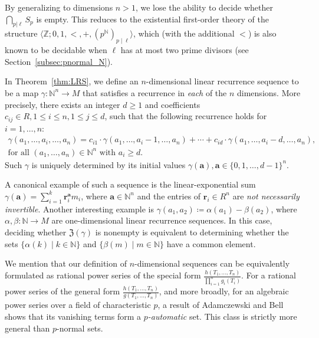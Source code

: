 \documentclass[letterpaper, 11pt, thm-restate]{article}
\numberwithin{equation}{section}
\newcommand{\Z}{\mathbb{Z}}
\newcommand{\N}{\mathbb{N}}
\newcommand{\mZ}{\mathfrak{Z}}
\newcommand{\ba}{\boldsymbol{a}}
\newcommand{\br}{\boldsymbol{r}}
\newcommand{\gen}[1]{\langle {#1} \rangle}
\theoremstyle{definition}
\theoremstyle{definition}
\theoremstyle{definition}
\begin{document}
By generalizing to dimensions $n > 1$, we lose the ability to decide whether $\bigcap_{p|\ell}S_p$ is empty.
This reduces to the existential first-order theory of the structure $\gen{\Z; 0, 1, <, +, \left(p^{\N}\right)_{p \mid \ell}}$, which (with the additional $<$) is also known to be decidable when $\ell$ has at most two prime divisors (see Section~\ref{subsec:pnormal_N}).

In Theorem~\ref{thm:LRS}, we define an $n$-dimensional linear recurrence sequence to be a map $\gamma \colon \N^n \rightarrow M$ that satisfies a recurrence in \emph{each} of the $n$ dimensions.
More precisely, there exists an integer $d \geq 1$ and coefficients $c_{ij} \in R, 1 \leq i \leq n, 1 \leq j \leq d$, such that the following recurrence holds for $i = 1, \ldots, n$:
\begin{multline*}
\gamma(a_1, \ldots, a_i, \ldots, a_n) = c_{i1} \cdot \gamma(a_1, \ldots, a_i-1, \ldots, a_n) + \cdots + c_{id} \cdot \gamma(a_1, \ldots, a_i-d, \ldots, a_n), \\
\text{for all $(a_1, \ldots, a_n) \in \N^n$ with $a_i\geq d$}.
\end{multline*}
Such $\gamma$ is uniquely determined by its initial values $\gamma(\ba), \ba \in \{0,1, \ldots, d-1\}^{n}$.

A canonical example of such a sequence is the linear-exponential sum $\gamma(\ba) = \sum_{i = 1}^k \br_i^{\ba} m_i$, where $\ba \in \N^n$ and the entries of $\br_i \in R^n$ are \emph{not necessarily invertible}.
Another interesting example is $\gamma(a_1, a_2) \coloneqq \alpha(a_1) - \beta(a_2)$, where $\alpha, \beta \colon \N \rightarrow M$ are one-dimensional linear recurrence sequences.
In this case, deciding whether $\mZ(\gamma)$ is nonempty is equivalent to determining whether the sets $\{\alpha(k) \mid k \in \N\}$ and $\{\beta(m) \mid m \in \N\}$ have a common element.


We mention that our definition of $n$-dimensional sequences can be equivalently formulated as rational power series of the special form $\frac{h(T_1, \ldots, T_n)}{\prod_{i=1}^n g_i(T_i)}$.
For a rational power series of the general form $\frac{h(T_1, \ldots, T_n)}{g(T_1, \ldots, T_n)}$, and more broadly, for an algebraic power series over a field of characteristic $p$, a result of Adamczewski and Bell~\cite{adamczewski2012vanishing} shows that its vanishing terms form a \emph{$p$-automatic} set.
This class is strictly more general than $p$-normal sets.
\end{document}
